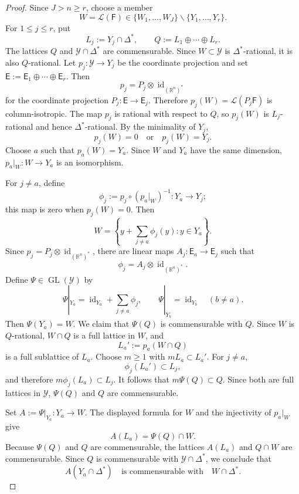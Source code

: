 \documentclass[reqno,11pt]{amsart}
\numberwithin{equation}{section}
\theoremstyle{definition}
\theoremstyle{remark}
\newcommand{\op}{\operatorname}
\newcommand{\R}{\mathbb R}
\newcommand{\id}{\op{id}}
\newcommand{\GL}{\op{GL}}
\begin{document}
\begin{proof}
Since $J>n\ge r$, choose a member
$$
W=\mathcal{L}(\mathsf F)\in\{W_1,\ldots,W_J\}\smallsetminus\{Y_1,\ldots,Y_r\}.
$$
For $1\le j\le r$, put
$$
L_j:=Y_j\cap\Delta^*,
\qquad
Q:=L_1\oplus\cdots\oplus L_r.
$$
The lattices $Q$ and $\mathcal Y\cap\Delta^*$ are commensurable.
Since $W\subset\mathcal Y$ is $\Delta^*$-rational, it is also
$Q$-rational. Let $p_j:\mathcal Y\to Y_j$ be the coordinate projection and set $\mathsf E:=\mathsf E_1\oplus\cdots\oplus \mathsf E_r$. Then
$$
p_j=P_j\otimes\id_{(\R^n)^*}
$$
for the coordinate projection $P_j:\mathsf E\to \mathsf E_j$. Therefore
$p_j(W)=\mathcal{L}(P_j\mathsf F)$ is column-isotropic. The map $p_j$ is rational with
respect to $Q$, so $p_j(W)$ is $L_j$-rational and hence
$\Delta^*$-rational. By the minimality of $Y_j$,
\begin{equation}\label{eq:projection-zero-or-surjective}
p_j(W)=0
\quad\text{or}\quad
p_j(W)=Y_j.
\end{equation}
Choose $a$ such that $p_a(W)=Y_a$. Since $W$ and $Y_a$ have the
same dimension, $p_a|_W:W\to Y_a$ is an isomorphism.

For $j\ne a$, define
$$
\phi_j:=p_j\circ(p_a|_W)^{-1}:Y_a\to Y_j;
$$
this map is zero when $p_j(W)=0$. Then
$$
W=
\left\{
 y+\sum_{j\ne a}\phi_j(y):y\in Y_a
\right\}.
$$
Since $p_j=P_j\otimes\id_{(\R^n)^*}$, there are
linear maps $A_j:\mathsf E_a\to \mathsf E_j$ such that
\begin{equation}\label{eq:phijtensor}
\phi_j=A_j\otimes\id_{(\R^n)^*}.
\end{equation}
Define $\Psi\in\GL(\mathcal Y)$ by
$$
\Psi|_{Y_a}
=
\id_{Y_a}+\sum_{j\ne a}\phi_j,
\qquad
\Psi|_{Y_b}=\id_{Y_b}\quad(b\ne a).
$$
Then $\Psi(Y_a)=W$. We claim that $\Psi(Q)$ is commensurable with $Q$. Since $W$ is
$Q$-rational, $W\cap Q$ is a full lattice in $W$, and
$$
L_a':=p_a(W\cap Q)
$$
is a full sublattice of $L_a$. Choose $m\ge1$ with
$mL_a\subset L_a'$. For $j\ne a$,
$$
\phi_j(L_a')\subset L_j,
$$
and therefore $m\phi_j(L_a)\subset L_j$. It follows that
$m\Psi(Q)\subset Q$. Since both are full lattices in $\mathcal Y$,
$\Psi(Q)$ and $Q$ are commensurable.

Set $A:=\Psi|_{Y_a}:Y_a\to W$. The displayed formula for $W$ and the injectivity
of $p_a|_W$ give
$$
A(L_a)=\Psi(Q)\cap W.
$$
Because $\Psi(Q)$ and $Q$ are commensurable, the lattices
$A(L_a)$ and $Q\cap W$ are commensurable. Since $Q$ is
commensurable with $\mathcal Y\cap\Delta^*$, we conclude that
\begin{equation}\label{eq:dual-quotient-lattices-commensurable}
A(Y_a\cap\Delta^*)
\quad\text{is commensurable with}\quad
W\cap\Delta^*.
\end{equation}


\end{proof}
\end{document}
